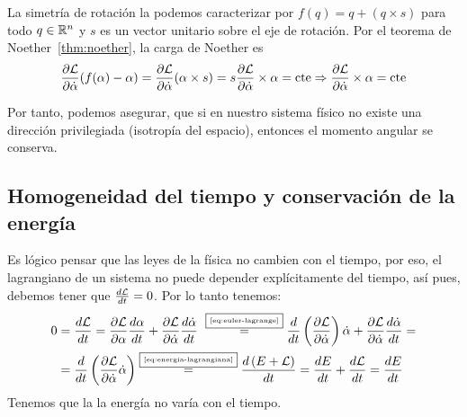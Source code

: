 La simetría de rotación la podemos caracterizar por $f(q)=q+(q\times s)$ para todo $q\in\mathbb{R}^n$ y $s$ es un vector unitario sobre el eje de rotación.
Por el teorema de Noether~\eqref{thm:noether}, la carga de Noether es
\begin{equation}
	\label{eq:conservacion_momento_angular}
	\frac{\partial \mathcal{L}}{\partial\dot{\alpha}}(f(\alpha)-\alpha) = \frac{\partial \mathcal{L}}{\partial\dot{\alpha}}(\alpha\times s) = s \frac{\partial \mathcal{L}}{\partial\dot{\alpha}}\times \alpha=\text{cte}\Rightarrow\frac{\partial \mathcal{L}}{\partial\dot{\alpha}}\times \alpha=\text{cte}
\end{equation}

Por tanto, podemos asegurar, que si en nuestro sistema físico no existe una dirección privilegiada (isotropía del espacio), entonces el momento angular se conserva.

\subsection{Homogeneidad del tiempo y conservación de la energía}\label{sec:homogeneidad-del-tiempo-y-conservacion-de-la-energia}



Es lógico pensar que las leyes de la física no cambien con el tiempo, por eso, el lagrangiano de un sistema no puede depender explícitamente del tiempo, así pues, debemos tener que $\frac{d\mathcal{L}}{dt}=0$.
Por lo tanto tenemos:
\begin{align*}
	0 & = \frac{d\mathcal{L}}{dt}=\frac{\partial \mathcal{L}}{\partial \alpha}\frac{d\alpha}{dt}+\frac{\partial \mathcal{L}}{\partial \dot{\alpha}}\frac{d\dot{\alpha}}{dt} ~\overset{\fbox{\tiny \ref{eq:euler-lagrange}}}{=} \frac{d}{dt}\left(\frac{\partial \mathcal{L}}{\partial \dot{\alpha}}\right)\dot{\alpha}+\frac{\partial \mathcal{L}}{\partial \dot{\alpha}}\frac{d\dot{\alpha}}{dt}=\\
	& = \frac{d}{dt}\left(\frac{\partial \mathcal{L}}{\partial \dot{\alpha}}\dot{\alpha}\right)\overset{\fbox{\tiny \ref{eq:energia-lagrangiana}}}{=}\frac{d\left(E+\mathcal{L}\right)}{dt}=\frac{d E}{dt}+\frac{d\mathcal{L}}{dt}=\frac{d E}{dt}
\end{align*}
Tenemos que la la energía no varía con el tiempo.
